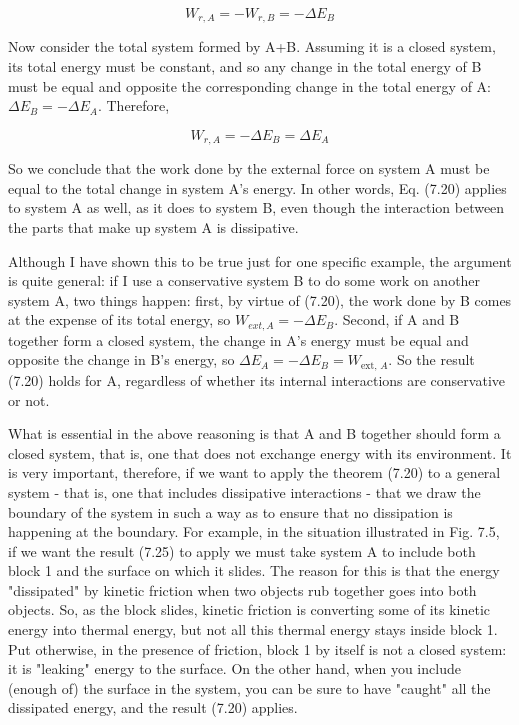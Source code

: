\documentclass[10pt]{article}
\begin{document}
\begin{equation*}
W_{r, A}=-W_{r, B}=-\Delta E_{B} \tag{7.24}
\end{equation*}


Now consider the total system formed by A+B. Assuming it is a closed system, its total energy must be constant, and so any change in the total energy of B must be equal and opposite the corresponding change in the total energy of A: $\Delta E_{B}=-\Delta E_{A}$. Therefore,


\begin{equation*}
W_{r, A}=-\Delta E_{B}=\Delta E_{A} \tag{7.25}
\end{equation*}


So we conclude that the work done by the external force on system A must be equal to the total change in system A's energy. In other words, Eq. (7.20) applies to system A as well, as it does to system B, even though the interaction between the parts that make up system A is dissipative.

Although I have shown this to be true just for one specific example, the argument is quite general: if I use a conservative system B to do some work on another system A, two things happen: first, by virtue of (7.20), the work done by B comes at the expense of its total energy, so $W_{e x t, A}=-\Delta E_{B}$. Second, if A and B together form a closed system, the change in A's energy must be equal and opposite the change in B's energy, so $\Delta E_{A}=-\Delta E_{B}=W_{\text {ext, } A}$. So the result (7.20) holds for A, regardless of whether its internal interactions are conservative or not.

What is essential in the above reasoning is that A and B together should form a closed system, that is, one that does not exchange energy with its environment. It is very important, therefore, if we want to apply the theorem (7.20) to a general system - that is, one that includes dissipative interactions - that we draw the boundary of the system in such a way as to ensure that no dissipation is happening at the boundary. For example, in the situation illustrated in Fig. 7.5, if we want the result (7.25) to apply we must take system A to include both block 1 and the surface on which it slides. The reason for this is that the energy "dissipated" by kinetic friction when two objects rub together goes into both objects. So, as the block slides, kinetic friction is converting some of its kinetic energy into thermal energy, but not all this thermal energy stays inside block 1. Put otherwise, in the presence of friction, block 1 by itself is not a closed system: it is "leaking" energy to the surface. On the other hand, when you include (enough of) the surface in the system, you can be sure to have "caught" all the dissipated energy, and the result (7.20) applies.
\end{document}
